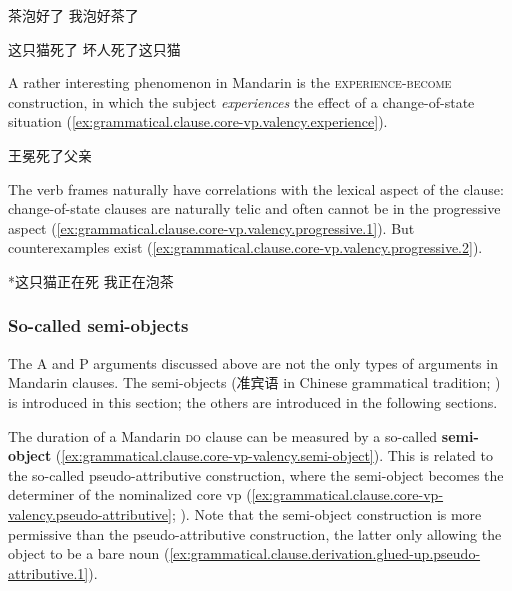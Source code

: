 \documentclass[UTF8, a4paper, oneside, scheme=plain, 12pt]{ctexrep}
\newcommand*{\citepage}[1]{p.~{#1}}
\newcommand*{\concept}[1]{\textbf{#1}}
\newcommand*{\category}[1]{\textsc{#1}}
\begin{document}
\begin{exe}
    \ex\label{ex:grammatical.clause.core-vp.valency.become} \begin{xlist}
        \ex\label{ex:grammatical.clause.core-vp.valency.become.1} 茶泡好了
        \ex 我泡好茶了
    \end{xlist}

    \ex\label{ex:grammatical.clause.core-vp.valency.become-only}
    \begin{xlist}
        \ex\label{ex:grammatical.clause.core-vp.valency.become-only.1} 这只猫死了
        \ex *坏人死了这只猫
    \end{xlist}
\end{exe}

A rather interesting phenomenon in Mandarin is the \category{experience}-\category{become} construction,
in which the subject \emph{experiences} the effect of a change-of-state situation
(\ref{ex:grammatical.clause.core-vp.valency.experience}).

\begin{exe}
    \ex\label{ex:grammatical.clause.core-vp.valency.experience}
    \begin{xlist}
        \ex 王冕死了父亲
    \end{xlist}
\end{exe}

The verb frames naturally have correlations with the lexical aspect of the clause:
change-of-state clauses are naturally telic and often cannot be in the progressive aspect
(\ref{ex:grammatical.clause.core-vp.valency.progressive.1}).
But counterexamples exist
(\ref{ex:grammatical.clause.core-vp.valency.progressive.2}).

\begin{exe}
    \ex\label{ex:grammatical.clause.core-vp.valency.progressive.1} *这只猫正在死
    \ex\label{ex:grammatical.clause.core-vp.valency.progressive.2} 我正在泡茶
\end{exe}

\subsubsection{So-called semi-objects}

The A and P arguments discussed above are not the only types of arguments in Mandarin clauses.
The semi-objects (准宾语 in Chinese grammatical tradition; \citealt[\citepage{132}]{zhudexigrammar}) is introduced in this section;
the others are introduced in the following sections.

The duration of a Mandarin \category{do} clause
can be measured by a so-called \concept{semi-object}
(\ref{ex:grammatical.clause.core-vp-valency.semi-object}).
This is related to the so-called pseudo-attributive construction,
where the semi-object becomes the determiner of the nominalized core \ac{vp}
(\ref{ex:grammatical.clause.core-vp-valency.pseudo-attributive};
).
Note that the semi-object construction is more permissive 
than the pseudo-attributive construction,
the latter only allowing the object to be a bare noun
(\ref{ex:grammatical.clause.derivation.glued-up.pseudo-attributive.1}).
\end{document}
